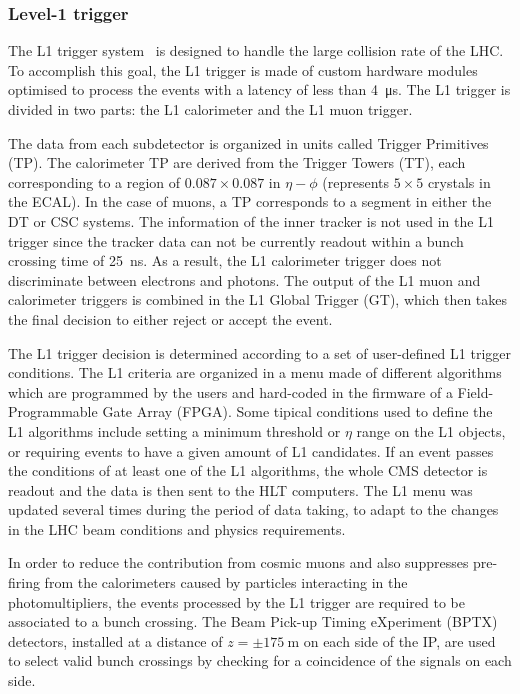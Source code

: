 \subsubsection{Level-1 trigger}

The L1 trigger system~\cite{CMSTrigger} is designed to handle the large collision rate of the LHC. To accomplish this goal, the L1 trigger is made of custom hardware modules optimised to process the events with a latency of less than \SI{4}{\us}. The L1 trigger is divided in two parts: the L1 calorimeter and the L1 muon trigger.

The data from each subdetector is organized in units called Trigger Primitives (TP). The calorimeter TP are derived from the Trigger Towers (TT), each corresponding to a region of ${0.087}\times{0.087}$ in $\eta-\phi$ (represents $5\times{5}$ crystals in the ECAL). In the case of muons, a TP corresponds to a segment in either the DT or CSC systems. The information of the inner tracker is not used in the L1 trigger since the tracker data can not be currently readout within a bunch crossing time of \SI{25}{\ns}. As a result, the L1 calorimeter trigger does not discriminate between electrons and photons. The output of the L1 muon and calorimeter triggers is combined in the L1 Global Trigger (GT), which then takes the final decision to either reject or accept the event.

The L1 trigger decision is determined according to a set of user-defined L1 trigger conditions. The L1 criteria are organized in a menu made of different algorithms which are programmed by the users and hard-coded in the firmware of a Field-Programmable Gate Array (FPGA). Some tipical conditions used to define the L1 algorithms include setting a minimum \pt threshold or $\eta$ range on the L1 objects, or requiring events to have a given amount of L1 candidates. If an event passes the conditions of at least one of the L1 algorithms, the whole CMS detector is readout and the data is then sent to the HLT computers. The L1 menu was updated several times during the period of data taking, to adapt to the changes in the LHC beam conditions and physics requirements.

In order to reduce the contribution from cosmic muons and also suppresses pre-firing from the calorimeters caused by particles interacting in the photomultipliers, the events processed by the L1 trigger  are required to be associated to a bunch crossing. The Beam Pick-up Timing eXperiment (BPTX) detectors, installed at a distance of $z = {\pm}\SI{175}{\meter}$ on each side of the IP, are used to select valid bunch crossings by checking for a coincidence of the signals on each side.

